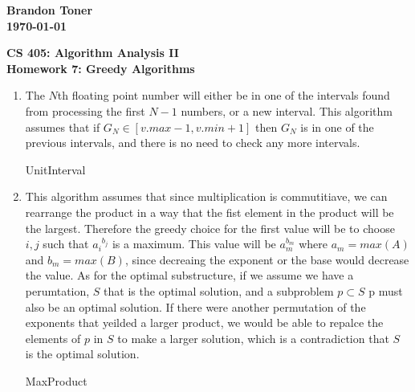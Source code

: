 \documentclass{article}%
\begin{document}
\begin{flushright}
\textbf{Brandon Toner \\
\today}
\end{flushright}

\begin{center}
\textbf{CS 405: Algorithm Analysis II \\
Homework 7: Greedy Algorithms} \\
\end{center}

\begin{enumerate}
\item The $N$th floating point number will either be in one of the intervals found from processing the first $N-1$ numbers, or a new interval.  This algorithm assumes that if $G_N \in [v.max - 1, v.min + 1]$ then $G_N$ is in one of the previous intervals, and there is no need to check any more intervals.\\
\begin{algorithm}
    \DontPrintSemicolon
\caption{UnitInterval\label{IR}}
\end{algorithm}

\item This algorithm assumes that since multiplication is commutitiave, we can rearrange the product in a way that the fist element in the product will be the largest. Therefore the greedy choice for the first value will be to choose $i,j$ such that ${a_i}^{b_j}$ is a maximum. This value will be $a_m^{b_m}$ where $a_m = max(A)$ and $b_m = max(B)$, since decreaing the exponent or the base would decrease the value.  As for the optimal substructure, if we assume we have a perumtation, $S$ that is the optimal solution, and a subproblem $p \subset S$ p must also be an optimal solution.  If there were another permutation of the exponents that yeilded a larger product, we would be able to repalce the elements of $p$ in $S$ to make a larger solution, which is a contradiction that $S$ is the optimal solution.\\
\begin{algorithm}
    \DontPrintSemicolon
\caption{MaxProduct\label{IR}}
\end{algorithm}


\end{enumerate}
\end{document}
